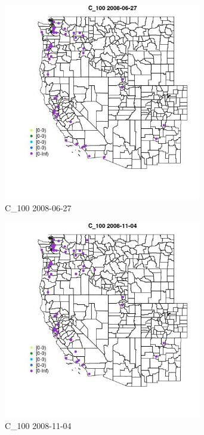 \begin{figure} 
\centering  
\includegraphics[width=0.77\textwidth]{Code_Outputs/Report_ML_input_PM25_Step4_part_e_de_duplicated_aves_MapObsC_1002008-06-27.jpg} 
\caption{\label{fig:Report_ML_input_PM25_Step4_part_e_de_duplicated_avesMapObsC_1002008-06-27}C_100 2008-06-27} 
\end{figure} 
 

\begin{figure} 
\centering  
\includegraphics[width=0.77\textwidth]{Code_Outputs/Report_ML_input_PM25_Step4_part_e_de_duplicated_aves_MapObsC_1002008-11-04.jpg} 
\caption{\label{fig:Report_ML_input_PM25_Step4_part_e_de_duplicated_avesMapObsC_1002008-11-04}C_100 2008-11-04} 
\end{figure} 
 

